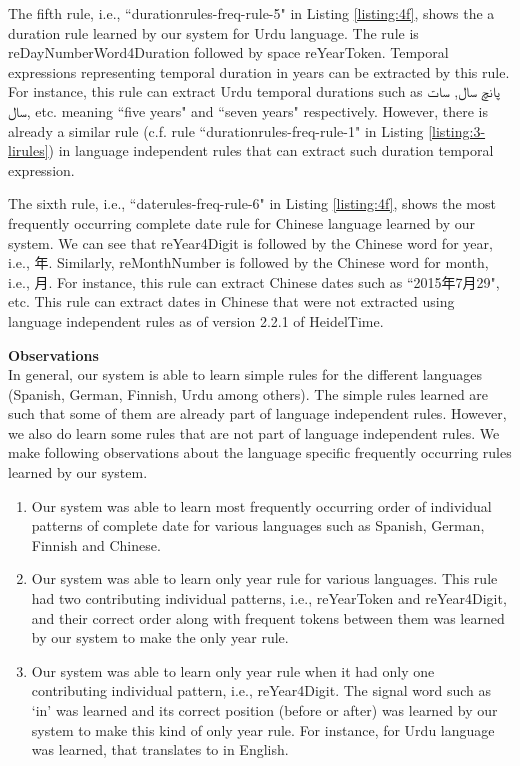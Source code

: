 The fifth rule, i.e., ``durationrules-freq-rule-5" in Listing \ref{listing:4f}, shows the a duration rule learned by our system for Urdu language. The rule is reDayNumberWord4Duration followed by space reYearToken. Temporal expressions representing temporal duration in years can be extracted by this rule. For instance, this rule can extract Urdu temporal durations such as \texturdu{پانچ سال}, \texturdu{سات سال}, etc. meaning ``five years" and ``seven years" respectively. However, there is already a similar rule (c.f. rule ``durationrules-freq-rule-1" in Listing \ref{listing:3-lirules}) in language independent rules that can extract such duration temporal expression.

The sixth rule, i.e., ``daterules-freq-rule-6" in Listing \ref{listing:4f}, shows the most frequently occurring complete date rule for Chinese language learned by our system. We can see that reYear4Digit is followed by the Chinese word for year, i.e., 年. Similarly, reMonthNumber is followed by the Chinese word for month, i.e., 月. For instance, this rule can extract Chinese dates such as ``2015年7月29", etc. This rule can extract dates in Chinese that were not extracted using language independent rules as of version 2.2.1 of HeidelTime. 

\textbf{Observations}\\
In general, our system is able to learn simple rules for the different languages (Spanish, German, Finnish, Urdu among others). The simple rules learned are such that some of them are already part of language independent rules. However, we also do learn some rules that are not part of language independent rules. We make following observations about the language specific frequently occurring rules learned by our system. 
\begin{enumerate}[1.]	
	\item Our system was able to learn most frequently occurring order of individual patterns of complete date for various languages such as Spanish, German, Finnish and Chinese.	
	\item Our system was able to learn only year rule for various languages. This rule had two contributing individual patterns, i.e., reYearToken and reYear4Digit, and their correct order along with frequent tokens between them was learned by our system to make the only year rule.
	\item Our system was able to learn only year rule when it had only one contributing individual pattern, i.e., reYear4Digit. The signal word such as `in' was learned and its correct position (before or after) was learned by our system to make this kind of only year rule. For instance,  for Urdu language was learned, that translates to  in English. 
\end{enumerate}



